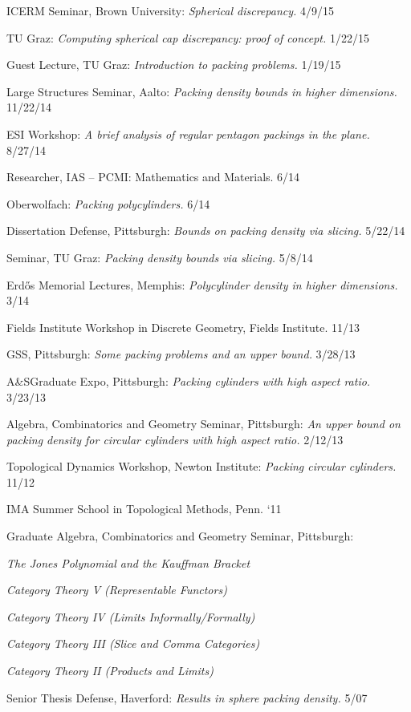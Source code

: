 \documentclass[10pt]{article}
\newenvironment{innerlist}[1][\enskip\textbullet]%
        {\begin{compactitem}[#1]}{\end{compactitem}}
\begin{document}
\begin{innerlist}[-]
\item ICERM Seminar, Brown University: \emph{Spherical discrepancy.}  4/9/15
\item TU Graz: \emph{Computing spherical cap discrepancy: proof of concept.} 1/22/15
\item Guest Lecture, TU Graz: \emph{Introduction to packing problems.} 1/19/15
\item Large Structures Seminar, Aalto: \emph{Packing density bounds in higher dimensions.} 11/22/14
\item ESI Workshop: \emph{A brief analysis of regular pentagon packings in the plane.} 8/27/14
\item Researcher, IAS -- PCMI: Mathematics and Materials. 6/14
\item Oberwolfach: \emph{Packing polycylinders.} 6/14
\item Dissertation Defense, Pittsburgh: \emph{Bounds on packing density via slicing.} 5/22/14
\item Seminar, TU Graz: \emph{Packing density bounds via slicing.} 5/8/14
\item Erd\H{o}s Memorial Lectures, Memphis: \emph{%
Polycylinder density in higher dimensions.} 3/14
\item Fields Institute Workshop in Discrete Geometry, Fields Institute. 11/13
\item GSS, Pittsburgh: \emph{Some packing problems and an upper bound.}  3/28/13
\item A\&SGraduate Expo, Pittsburgh:  \emph{Packing cylinders with high aspect ratio.}  3/23/13
\item Algebra, Combinatorics and Geometry Seminar, Pittsburgh: \emph{An upper bound on packing density for circular cylinders with high aspect ratio.} 2/12/13
\item Topological Dynamics Workshop, Newton Institute:  \emph{Packing circular cylinders.}  11/12
\item IMA Summer School in Topological Methods, Penn. `11
\item Graduate Algebra, Combinatorics and Geometry Seminar, Pittsburgh:
 \begin{innerlist}
		\item \emph{The Jones Polynomial and the Kauffman Bracket }
		\item \emph{Category Theory V (Representable Functors)}
		\item \emph{Category Theory IV (Limits Informally/Formally)}
		\item \emph{Category Theory III (Slice and Comma Categories)}
		\item \emph{Category Theory II (Products and Limits)}
\end{innerlist}
\item Senior Thesis Defense, Haverford: \emph{Results in sphere packing density.} 5/07
\end{innerlist}
\end{document}
